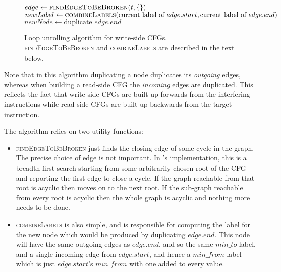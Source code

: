 \begin{figure}
\begin{algorithmic}
       \State $edge \gets \textsc{findEdgeToBeBroken}(t, \{\})$
       \State $newLabel \gets \textsc{combineLabels}(\text{current label of } edge.start, \text{current label of } edge.end)$
       \Else
           \State $newNode \gets \text{duplicate } edge.end$
           \EndFor
       \EndIf
    \EndWhile
  \EndFor
\end{algorithmic}
\caption{Loop unrolling algorithm for write-side CFGs.
  \textsc{findEdgeToBeBroken} and \textsc{combineLabels} are described
  in the text below.}
\label{fig:derive:store_cfg_unroll_alg}
\end{figure}

Note that in this algorithm duplicating a node duplicates its
\emph{outgoing} edges, whereas when building a read-side CFG the
\emph{incoming} edges are duplicated.  This reflects the fact that
write-side CFGs are built up forwards from the interfering
instructions while read-side CFGs are built up backwards from the
target instruction.

The algorithm relies on two utility functions:

\begin{itemize}
\item \textsc{findEdgeToBeBroken} just finds the closing edge of some
  cycle in the graph.  The precise choice of edge is not
  important.  In {\implementation}'s implementation, this is a
  breadth-first search starting from some arbitrarily chosen root of
  the CFG and reporting the first edge to close a cycle.  If the graph
  reachable from that root is acyclic then {\implementation} moves on
  to the next root.  If the sub-graph reachable from every root is
  acyclic then the whole graph is acyclic and nothing more needs to be
  done.
\item \textsc{combineLabels} is also simple, and is responsible for
  computing the label for the new node which would be produced by
  duplicating $edge.end$.  This node will have the same outgoing edges
  as $edge.end$, and so the same $min\_to$ label, and a single
  incoming edge from $edge.start$, and hence a $min\_from$ label which
  is just $edge.start$'s $min\_from$ with one added to every value.
\end{itemize}


